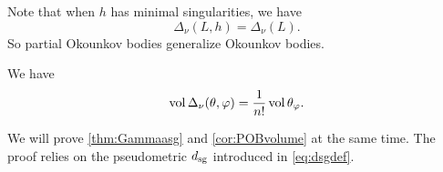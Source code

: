 Note that when $h$ has minimal singularities, we have
\[
\Delta_{\nu}(L,h)=\Delta_{\nu}(L).
\]
So partial Okounkov bodies generalize Okounkov bodies.

\begin{corollary}\label{cor:POBvolume}
    We have
\begin{equation}\label{eq:Okov}
    \operatorname{vol} \Delta_{\nu}(\theta,\varphi)=\frac{1}{n!}\operatorname{vol} \theta_{\varphi}.
\end{equation}
\end{corollary}

We will prove \cref{thm:Gammaasg} and \cref{cor:POBvolume} at the same time. The proof relies on the pseudometric $d_{\mathrm{sg}}$ introduced in \eqref{eq:dsgdef}.

